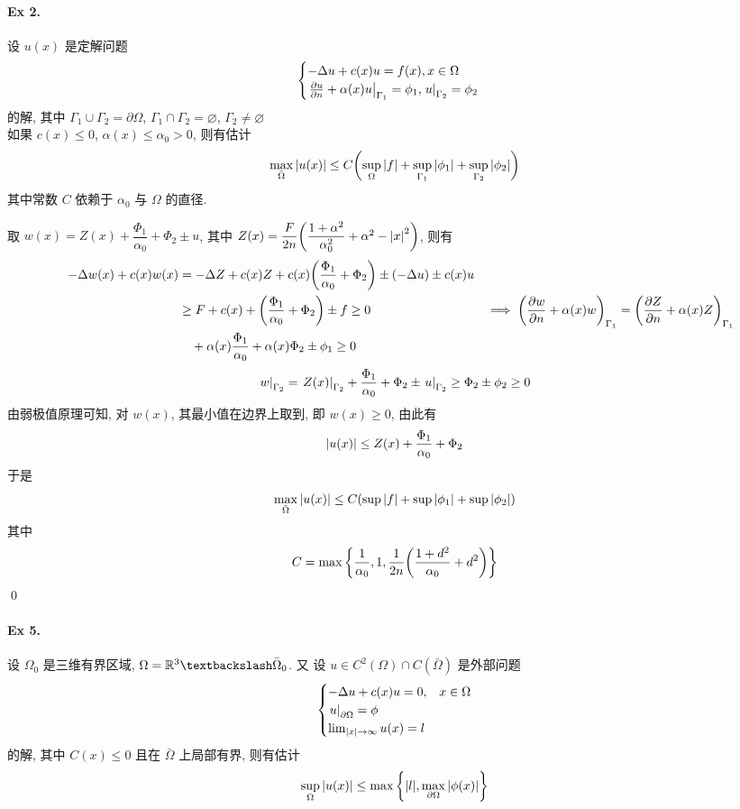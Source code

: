 \paragraph{Ex 2.}
设 $u(x)$ 是定解问题
\[ \begin{cases}
-\Delta u + c(x) u = f(x), x \in \Omega \\
{\left.{{\frac{\partial {u}}{\partial {n}}} + \alpha(x)u} \right|}_{\Gamma_1} = \phi_1,
{\left.{u} \right|}_{\Gamma_2} = \phi_2
\end{cases} \]
的解, 其中 $\Gamma_1 \cup \Gamma_2 = \partial\Omega$,
$\Gamma_1 \cap \Gamma_2 = \varnothing$, $\Gamma_2 \neq \varnothing$ \\
如果 $c(x) \leq 0$, $\alpha(x) \leq \alpha_0 > 0$, 则有估计
\[ \max_{\bar\Omega} {\lvert {u(x)} \rvert} \leq C{\left( {
    \sup_{\Omega}{\lvert {f} \rvert}+\sup_{\Gamma_1}{\lvert {\phi_1} \rvert}+\sup_{\Gamma_2}{\lvert {\phi_2} \rvert}
} \right)} \]
其中常数 $C$ 依赖于 $\alpha_0$ 与 $\Omega$ 的直径.

\begin{solution}
取 $w(x) = Z(x) + \dfrac{\Phi_1}{\alpha_0} + \Phi_2 \pm u$, 其中
$Z(x)=\dfrac F{2n}{\left( {\dfrac{1+\alpha^2}{\alpha_0^2}+\alpha^2-{\lvert {x} \rvert}^2} \right)}$,
则有 
\begin{align*}
\quad-\Delta w(x) + c(x)w(x)
&= -\Delta Z + c(x)Z + c(x) \biggl( \dfrac{\Phi_1}{\alpha_0} + \Phi_2 \biggr)
    \pm (-\Delta u) \pm c(x)u \\
&\geq F + c(x) + \biggl( \dfrac{\Phi_1}{\alpha_0} + \Phi_2 \biggr) \pm f \geq 0
&\implies {\left( {{\frac{\partial {w}}{\partial {n}}}+\alpha(x)w} \right)}_{\Gamma_1}
    = {\left( {{\frac{\partial {Z}}{\partial {n}}}+\alpha(x)Z} \right)}_{\Gamma_1} \\
    &\quad+ \alpha(x)\frac{\Phi_1}{\alpha_0} + \alpha(x)\Phi_2 \pm \phi_1 \geq 0
\end{align*}
\[
{\left.{w} \right|}_{\Gamma_2}={\left.{Z(x)} \right|}_{\Gamma_2}+\frac{\Phi_1}{\alpha_0}+\Phi_2
\pm {\left.{u} \right|}_{\Gamma_2} \geq \Phi_2 \pm \phi_2 \geq 0
\]
由弱极值原理可知, 对 $w(x)$, 其最小值在边界上取到, 即 $w(x) \geq 0$, 由此有
\[{\lvert {u(x)} \rvert} \leq Z(x) + \frac{\Phi_1}{\alpha_0} + \Phi_2\]
于是
\[\max_{\bar\Omega} {\lvert {u(x)} \rvert} \leq C{\left( {
    \sup{\lvert {f} \rvert}+\sup{\lvert {\phi_1} \rvert}+\sup{\lvert {\phi_2} \rvert}
} \right)} \]
其中
\[ C = \max{\left\{ {
    \frac 1{\alpha_0}, 1, \frac 1{2n}{\left( {\frac{1+d^2}{\alpha_0} + d^2} \right)}
} \right\}} \]
\qed
\end{solution}
\paragraph{Ex 5.}
设 $\Omega_0$ 是三维有界区域, $\Omega = \mreal^3\textbackslash\bar\Omega_0$. 又
设 $u \in C^2(\Omega) \cap C(\bar\Omega)$ 是外部问题
\[ \begin{cases}
-\Delta u + c(x) u = 0, & x \in \Omega \\
{\left.{u} \right|}_{\partial\Omega} = \phi \\
\lim_{{\lvert {x} \rvert} \to \infty} u(x) = l
\end{cases} \]
的解, 其中 $C(x) \leq 0$ 且在 $\bar\Omega$ 上局部有界, 则有估计
\[ \sup_{\Omega} {\lvert {u(x)} \rvert} \leq \max {\left\{ {
    {\lvert {l} \rvert}, \max_{\partial\Omega} {\lvert {\phi(x)} \rvert}
} \right\}} \]

